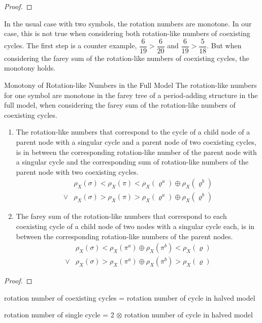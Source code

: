 \begin{proof}
\end{proof}

In the usual case with two symbols, the rotation numbers are monotone.
In our case, this is not true when considering both rotation-like numbers of coexisting cycles.
The first step is a counter example, $\dfrac{6}{19} > \dfrac{6}{20}$ and $\dfrac{6}{19} > \dfrac{5}{18}$.
But when considering the farey sum of the rotation-like numbers of coexisting cycles, the monotony holds.

\begin{theorem}{Monotony of Rotation-like Numbers in the Full Model}
	The rotation-like numbers for one symbol are monotone in the farey tree of a period-adding structure in the full model, when considering the farey sum of the rotation-like numbers of coexisting cycles.
	\begin{enumerate}
		\item The rotation-like numbers that correspond to the cycle of a child node of a parent node with a singular cycle and a parent node of two coexisting cycles, is in between the corresponding rotation-like number of the parent node with a singular cycle and the corresponding sum of rotation-like numbers of the parent node with two coexisting cycles.
		      \begin{align*}
			           & \rho_X(\sigma) < \rho_X(\pi) < \rho_X(\varrho^a) \oplus \rho_X(\varrho^b) \\
			      \lor & \rho_X(\sigma) > \rho_X(\pi) > \rho_X(\varrho^a) \oplus \rho_X(\varrho^b)
		      \end{align*}
		\item The farey sum of the rotation-like numbers that correspond to each coexisting cycle of a child node of two nodes with a singular cycle each, is in between the corresponding rotation-like numbers of the parent nodes.
		      \begin{align*}
			           & \rho_X(\sigma) < \rho_X(\pi^a) \oplus \rho_X(\pi^b) < \rho_X(\varrho) \\
			      \lor & \rho_X(\sigma) > \rho_X(\pi^a) \oplus \rho_X(\pi^b) > \rho_X(\varrho)
		      \end{align*}
	\end{enumerate}
\end{theorem}

\begin{proof}
\end{proof}


rotation number of coexisting cycles = rotation number of cycle in halved model

rotation number of single cycle = 2 $\otimes$ rotation number of cycle in halved model
